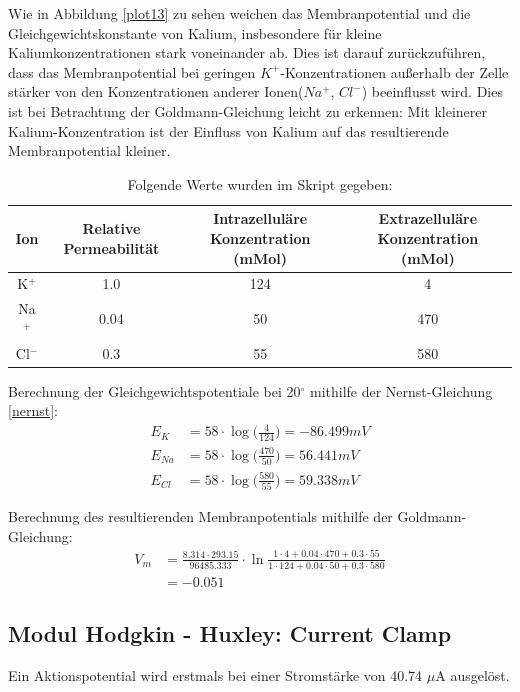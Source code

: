 \documentclass[11pt]{article}
\begin{document}
Wie in Abbildung \ref{plot13} zu sehen weichen das Membranpotential und die Gleichgewichtskonstante von Kalium, insbesondere für kleine Kaliumkonzentrationen stark voneinander ab. Dies ist darauf zurückzuführen, dass das Membranpotential bei geringen $K^+$-Konzentrationen außerhalb der Zelle stärker von den Konzentrationen anderer Ionen($Na^+$, $Cl^-$) beeinflusst wird. Dies ist bei Betrachtung der Goldmann-Gleichung leicht zu erkennen: Mit kleinerer Kalium-Konzentration ist der Einfluss von Kalium auf das resultierende Membranpotential kleiner. 

\begin{table}[H]
\caption{Folgende Werte wurden im Skript gegeben:}
\centering
\begin{adjustbox}{width=1.3\textwidth, center=\textwidth}
\begin{tabular}{c|c|c|c}
Ion & Relative Permeabilität & Intrazelluläre Konzentration (mMol) & Extrazelluläre Konzentration (mMol)\\ \hline\hline
K$^+$ & 1.0 & 124 & 4 \\ 
Na$^+$ & 0.04 & 50 & 470 \\
Cl$^-$ & 0.3 & 55 & 580
\end{tabular}
\end{adjustbox}
\label{werte-skript}
\end{table}

Berechnung der Gleichgewichtspotentiale bei 20$^\circ$ mithilfe der Nernst-Gleichung \ref{nernst}:
\begin{align}
E_K &= 58\cdot\log\bigg(\frac{4}{124}\bigg)= -86.499 mV\\
E_{Na} &= 58\cdot\log\bigg(\frac{470}{50}\bigg)=  56.441 mV\\
E_{Cl} &= 58\cdot\log\bigg(\frac{580}{55}\bigg)= 59.338 mV
\end{align}

Berechnung des resultierenden Membranpotentials mithilfe der Goldmann-Gleichung:
\begin{align}
V_m&=\frac{8.314\cdot 293.15}{96485.333}\cdot\ln\frac{1\cdot 4+0.04\cdot470+0.3\cdot55}{1\cdot 124+0.04\cdot50+0.3\cdot580}\\
&= -0.051
\end{align}

\subsection{Modul Hodgkin - Huxley: Current Clamp}
Ein Aktionspotential wird erstmals bei einer Stromstärke von 40.74 $\mu$A ausgelöst.
\end{document}
